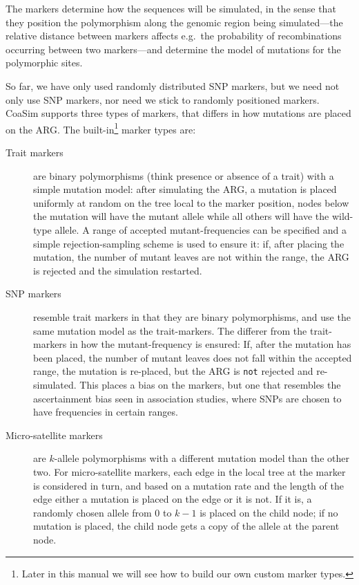 \documentclass{manual}
\begin{document}
\begin{empfile}
The markers determine how the sequences will be simulated, in the
sense that they position the polymorphism along the genomic region
being simulated---the relative distance between markers affects e.g.\ 
the probability of recombinations occurring between two markers---and
determine the model of mutations for the polymorphic sites.

So far, we have only used randomly distributed SNP markers, but we
need not only use SNP markers, nor need we stick to randomly
positioned markers.  CoaSim supports three types of markers, that
differs in how mutations are placed on the ARG.  The
built-in\footnote{Later in this manual we will see how to build our
  own custom marker types.} marker types are:
\begin{description}
\item[Trait markers] are binary polymorphisms (think presence or
  absence of a trait) with a simple mutation model: after simulating
  the ARG, a mutation is placed uniformly at random on the tree local
  to the marker position, nodes below the mutation will have the
  mutant allele while all others will have the wild-type allele.  A
  range of accepted mutant-frequencies can be specified and a simple
  rejection-sampling scheme is used to ensure it: if, after placing
  the mutation, the number of mutant leaves are not within the range,
  the ARG is rejected and the simulation restarted.
  
\item[SNP markers] resemble trait markers in that they are binary
  polymorphisms, and use the same mutation model as the trait-markers.
  The differer from the trait-markers in how the mutant-frequency is
  ensured: If, after the mutation has been placed, the number of
  mutant leaves does not fall within the accepted range, the mutation
  is re-placed, but the ARG is \texttt{not} rejected and
  re-simulated.  This places a bias on the markers, but one that
  resembles the ascertainment bias seen in association studies, where
  SNPs are chosen to have frequencies in certain ranges.
  
\item[Micro-satellite markers] are $k$-allele polymorphisms with a
  different mutation model than the other two.  For micro-satellite
  markers, each edge in the local tree at the marker is considered in
  turn, and based on a mutation rate and the length of the edge either
  a mutation is placed on the edge or it is not.  If it is, a randomly
  chosen allele from $0$ to $k-1$ is placed on the child node; if no
  mutation is placed, the child node gets a copy of the allele at the
  parent node.
\end{description}


\end{empfile}
\end{document}
